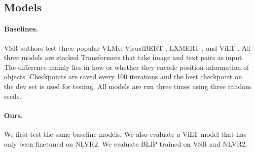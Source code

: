 \subsection{Models}\label{sec:vsr_models}

\paragraph{Baselines.} VSR authors \cite{liu2022visual} test three popular VLMs: VisualBERT \cite{li2019visualbert}, 
LXMERT \cite{tan2020lxmert}, and
ViLT \cite{kim2021vilt}. All three models are stacked Transformers \cite{vaswani2017attention} that take image and text pairs as input. The difference mainly lies in how or whether they encode position information of objects. Checkpoints are saved every 100 iterations and the best checkpoint on the dev set is used for testing. All models are run three times using three random seeds.

\paragraph{Ours.} We first test the same baseline models. We also evaluate a ViLT model that has only been finetuned on NLVR2. We evaluate BLIP \cite{li2022blip} trained on VSR and NLVR2.

